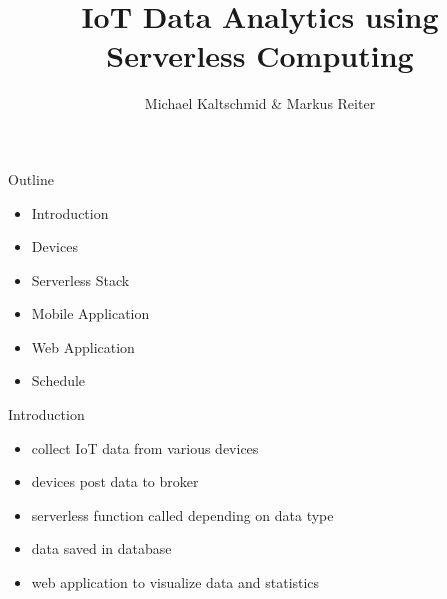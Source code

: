 \documentclass[aspectratio=1610]{beamer}
\title{IoT Data Analytics using Serverless Computing}
\author{Michael Kaltschmid \& Markus Reiter}
\date{}
\begin{document}
  \maketitle

  \begin{frame}{Outline}
    \begin{itemize}
      \item Introduction
      \item Devices
      \item Serverless Stack
      \item Mobile Application
      \item Web Application
      \item Schedule
    \end{itemize}
  \end{frame}

  \begin{frame}{Introduction}
    \begin{itemize}
      \item collect IoT data from various devices
      \item devices post data to broker
      \item serverless function called depending on data type
      \item data saved in database
      \item web application to visualize data and statistics
    \end{itemize}
  \end{frame}
\end{document}
